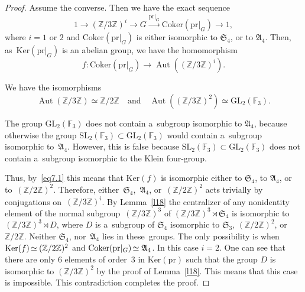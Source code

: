\documentclass{amsart}
\numberwithin{equation}{section}
\theoremstyle{plain}
\theoremstyle{definition}
\theoremstyle{remark}
\begin{document}
\begin{proof}
Assume the converse. Then we have the exact sequence
$$
1 \to (\mathbb{Z}/3\mathbb{Z})^i \to G \xrightarrow{\mathrm{pr}|_{G}} \mathrm{Coker}(\mathrm{pr} |_G) \to 1,
$$
where $i=1$ or $2$ and $\mathrm{Coker}(\mathrm{pr}|_G)$ is either isomorphic to $\mathfrak{S}_4$, or to $\mathfrak{A}_4$. Then, as~$\mathrm{Ker}(\mathrm{pr}|_G)$ is an abelian group, we have the homomorphism
$$
f\colon \mathrm{Coker}(\mathrm{pr} |_G) \to \operatorname{Aut}( (\mathbb{Z}/3\mathbb{Z})^i ).
$$

\goodbreak

\noindent We have the isomorphisms
\begin{equation}
\label{eq7.1}
\operatorname{Aut}( \mathbb{Z}/3\mathbb{Z} ) \simeq \mathbb{Z}/2\mathbb{Z} \quad \text{and} \quad \operatorname{Aut}( (\mathbb{Z}/3\mathbb{Z})^2 ) \simeq \mathrm{GL}_2(\mathbb{F}_3).
\end{equation}

The group $\mathrm{GL}_2(\mathbb{F}_3)$ does not contain a~subgroup isomorphic to $\mathfrak{A}_4$, because otherwise the group $\mathrm{SL}_2(\mathbb{F}_3) \subset \mathrm{GL}_2(\mathbb{F}_3)$ would contain a~subgroup isomorphic to~$\mathfrak{A}_4$. However, this is false because $\mathrm{SL}_2(\mathbb{F}_3) \subset \mathrm{GL}_2(\mathbb{F}_3)$ does not contain a~subgroup isomorphic to the Klein four-group.

Thus, by~\eqref{eq7.1} this means that $\mathrm{Ker}(f)$ is isomorphic either
to $\mathfrak{S}_4$, to $\mathfrak{A}_4$, or to~$(\mathbb{Z}/2\mathbb{Z})^2$.
Therefore, either~$\mathfrak{S}_4$,~$\mathfrak{A}_4$,
or~$(\mathbb{Z}/2\mathbb{Z})^2$ acts trivially by conjugations
on~$(\mathbb{Z}/3\mathbb{Z})^i$. By Lemma~\ref{l18} the centralizer of any
nonidentity element of the normal subgroup~$ (\mathbb{Z}/3\mathbb{Z})^3$ of
$(\mathbb{Z}/3\mathbb{Z})^3 \rtimes \mathfrak{S}_4$ is isomorphic
to~$(\mathbb{Z}/3\mathbb{Z})^3 \rtimes D$, where $D$ is a~subgroup of
$\mathfrak{S}_4$ isomorphic to $\mathfrak{S}_3$,
$(\mathbb{Z}/2\mathbb{Z})^2$, or $\mathbb{Z}/2\mathbb{Z}$. Neither
$\mathfrak{S}_4$, nor~$\mathfrak{A}_4$ lies in these~groups. The only
possibility is when $\mathrm{Ker}(f)\mkern-2mu \simeq \mkern-1mu (\mathbb{Z}/2\mathbb{Z})^2$ and
${\mathrm{Coker}(\mathrm{pr} |_G) \mkern-2mu\simeq \mathfrak{A}_4}$. In this case $i=2$.
One can see that there are only $6$ elements of order~$3$ in
$\mathrm{Ker}(\mathrm{pr})$ such that the group $D$ is isomorphic to
$(\mathbb{Z}/3\mathbb{Z})^2$ by the proof of Lemma~\ref{l18}. This means that
this case is impossible. This contradiction completes the proof.
\end{proof}
\end{document}
